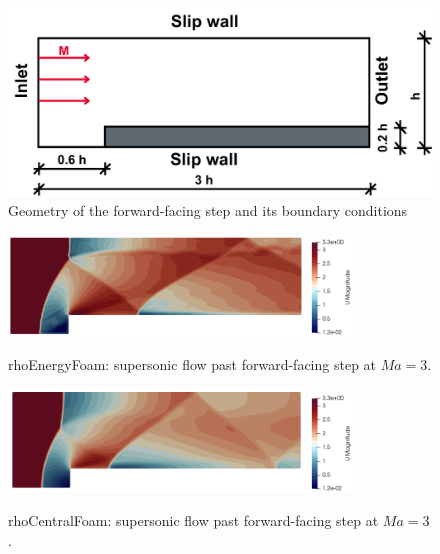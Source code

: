 \documentclass[a5paper]{sapthesis}
\begin{document}
	\begin{figure}
		\centering
		\includegraphics[width=0.8 \linewidth]{Figures/FS_Geometry}
		\caption{Geometry of the forward-facing step and its boundary conditions}
		\label{FS_Geometry}
	\end{figure} 
	
	\begin{figure}
		\centering
		\subfloat
		{\includegraphics[width=0.7\textwidth]{Figures/FS_velocity}} \quad 
		\subfloat
		\centering
		{\includegraphics[width=0.1\textwidth, height=0.16\textheight]{Figures/FS_velocitybar}}
		\caption{rhoEnergyFoam: supersonic ﬂow past forward-facing step at $Ma = 3$.}
		\label{FS_ref}
	\end{figure}
	
	\begin{figure}
		\centering
		\subfloat
		{\includegraphics[width=0.7\textwidth]{Figures/FS_rcf}} \quad 
		\subfloat
		\centering
		{\includegraphics[width=0.1\textwidth, height=0.16\textheight]{Figures/FS_velocitybar}}
		\caption{rhoCentralFoam: supersonic ﬂow past forward-facing step at $Ma = 3$.}
		\label{FS_rcf}
	\end{figure}
	
\end{document}
